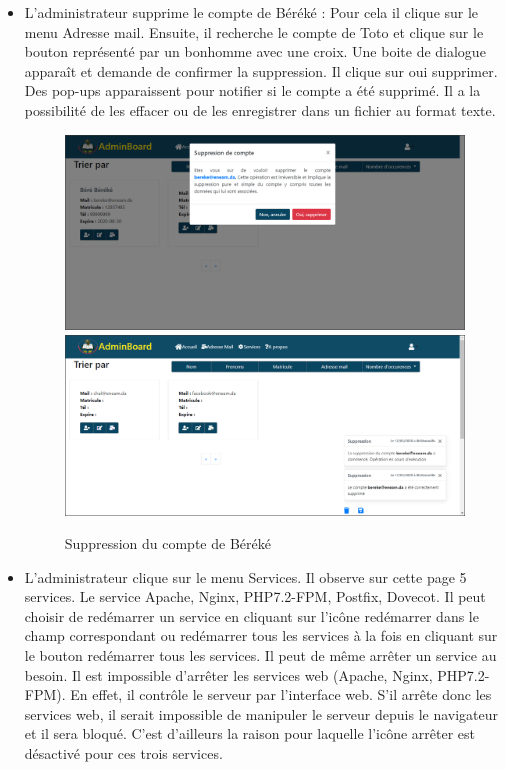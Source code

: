 \documentclass[a4paper,12pt,french]{report} %
\begin{document}
\begin{itemize}
\item L'administrateur supprime le compte de Béréké : Pour cela il clique sur le menu Adresse mail. Ensuite, il recherche le compte de Toto et clique sur le bouton représenté par un bonhomme avec une croix. Une boite de dialogue apparaît et demande de confirmer la suppression. Il clique sur oui supprimer. Des pop-ups apparaissent pour notifier si le compte a été supprimé. Il a la possibilité de les effacer ou de les enregistrer dans un fichier au format texte. %
\begin{figure}[H]
\centering
\includegraphics[width=483pt]{figure/admin_delete_bereke_acount1.png} \\[1cm]
\includegraphics[width=483pt]{figure/admin_delete_bereke_acount2.png}
\caption{Suppression du compte de Béréké}
\end{figure}  
\item L'administrateur clique sur le menu Services. Il observe sur cette page 5 services. Le service Apache, Nginx, PHP7.2-FPM, Postfix, Dovecot. Il peut choisir de redémarrer un service en cliquant sur l'icône redémarrer dans le champ correspondant ou redémarrer tous les services à la fois en cliquant sur le bouton redémarrer tous les services. Il peut de même arrêter un service au besoin. Il est impossible d'arrêter les services web (Apache, Nginx, PHP7.2-FPM). En effet, il contrôle le serveur par l'interface web. S'il arrête donc les services web, il serait impossible de manipuler le serveur depuis le navigateur et il sera bloqué. C'est d'ailleurs la raison pour laquelle l'icône arrêter est désactivé pour ces trois services.

\end{itemize}
\end{document}

